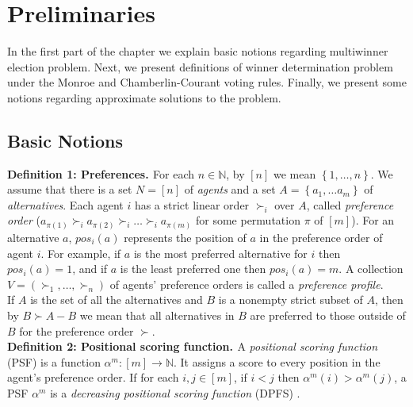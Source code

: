 \chapter{Preliminaries}
\label{cha:preliminaries}

In the first part of the chapter we explain basic notions regarding multiwinner election problem. Next, we present definitions of winner determination problem under the Monroe and Chamberlin-Courant voting rules. Finally, we present some notions regarding approximate solutions to the problem.

\section{Basic Notions}

\noindent
\textbf{Definition 1: Preferences. \cite{1}} \hspace{.1in} For each $n \in \mathbb{N}$, by $[n]$ we mean $\left\{ 1, \ldots, n \right\}$. We assume that there is a set $N = [n]$ of \textit{agents} and a set $A = \left\{ a_{1}, \ldots a_{m} \right\}$ of \textit{alternatives}. Each agent $i$ has a strict linear order $\succ_{i}$ over $A$, called \textit{preference order} ($a_{\pi(1)} \succ_{i} a_{\pi(2)} \succ_{i} \ldots \succ_{i} a_{\pi(m)}$ for some permutation $\pi$ of $[m]$). For an alternative $a$, $pos_{i}(a)$ represents the position of $a$ in the preference order of agent $i$. For example, if $a$ is the most preferred alternative for $i$ then $pos_{i}(a) = 1$, and if $a$ is the least preferred one then $pos_{i}(a) = m$. A collection $V = (\succ_{1}, \ldots, \succ_{n})$ of agents' preference orders is called a \textit{preference profile}.
\\

If $A$ is the set of all the alternatives and $B$ is a nonempty strict subset of $A$, then by $B \succ A - B$ we mean that all alternatives in $B$ are preferred to those outside of $B$ for the preference order $\succ$.
\\

\noindent
\textbf{Definition 2: Positional scoring function. \cite{1}} \hspace{.1in} A \textit{positional scoring function} (PSF) is a function $\alpha^{m}: [m] \rightarrow \mathbb{N}$. It assigns a score to every position in the agent's preference order. If for each $i,j \in [m]$, if $i < j$ then $\alpha^{m}(i) > \alpha^{m}(j)$, a PSF $\alpha^{m}$ is a \textit{decreasing positional scoring function} (DPFS) .
\\

